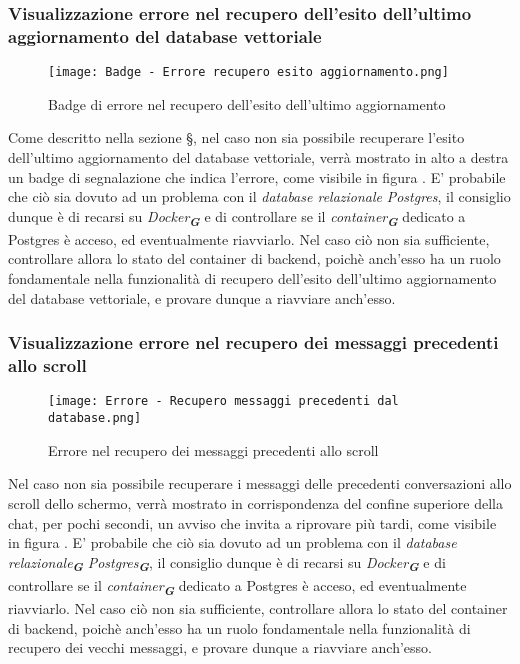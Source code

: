 \subsubsection{Visualizzazione errore nel recupero dell'esito dell'ultimo aggiornamento del database vettoriale}

\begin{figure}[h]
    \centering
        \texttt{[image: Badge - Errore recupero esito aggiornamento.png]}
        \caption{Badge di errore nel recupero dell'esito dell'ultimo aggiornamento}
        \label{fig:Badge di errore nel recupero dell'esito dell'ultimo aggiornamento}
\end{figure}

Come descritto nella sezione \S{}, nel caso non sia possibile recuperare l'esito dell'ultimo aggiornamento del database vettoriale, verrà mostrato in alto a destra un badge di segnalazione che indica l'errore, come visibile in figura . E' probabile che ciò sia dovuto ad un problema con il \emph{database relazionale} \emph{Postgres}, il consiglio dunque è di recarsi su \emph{Docker}\textsubscript{\textbf{\textit{G}}} e di controllare se il \emph{container}\textsubscript{\textbf{\textit{G}}} dedicato a Postgres è acceso, ed eventualmente riavviarlo. Nel caso ciò non sia sufficiente, controllare allora lo stato del container di backend, poichè anch'esso ha un ruolo fondamentale nella funzionalità di recupero dell'esito dell'ultimo aggiornamento del database vettoriale, e provare dunque a riavviare anch'esso.


\subsubsection{Visualizzazione errore nel recupero dei messaggi precedenti allo scroll}

\begin{figure}[h]
    \centering
        \texttt{[image: Errore - Recupero messaggi precedenti dal database.png]}
        \caption{Errore nel recupero dei messaggi precedenti allo scroll}
        \label{fig:Errore nel recupero dei messaggi precedenti allo scroll}
\end{figure}

Nel caso non sia possibile recuperare i messaggi delle precedenti conversazioni allo scroll dello schermo, verrà mostrato in corrispondenza del confine superiore della chat, per pochi secondi, un avviso che invita a riprovare più tardi, come visibile in figura . E' probabile che ciò sia dovuto ad un problema con il \emph{database relazionale}\textsubscript{\textbf{\textit{G}}} \emph{Postgres}\textsubscript{\textbf{\textit{G}}}, il consiglio dunque è di recarsi su \emph{Docker}\textsubscript{\textbf{\textit{G}}} e di controllare se il \emph{container}\textsubscript{\textbf{\textit{G}}} dedicato a Postgres è acceso, ed eventualmente riavviarlo. Nel caso ciò non sia sufficiente, controllare allora lo stato del container di backend, poichè anch'esso ha un ruolo fondamentale nella funzionalità di recupero dei vecchi messaggi, e provare dunque a riavviare anch'esso.
